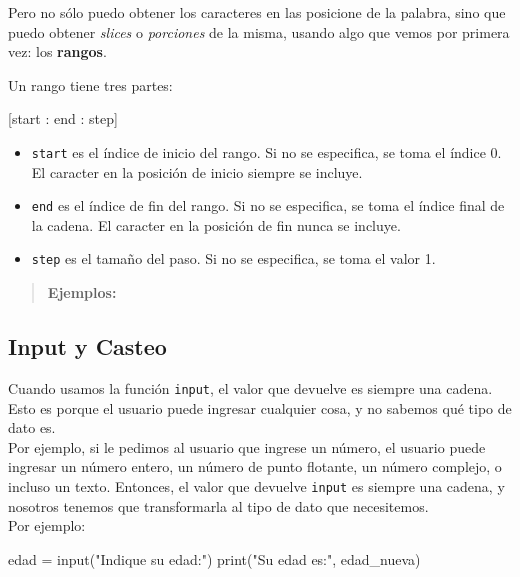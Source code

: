 \documentclass[
  letterpaper,
  DIV=11,
  numbers=noendperiod]{scrreprt}
\newenvironment{Shaded}{\begin{snugshade}}{\end{snugshade}}
\newcommand{\BuiltInTok}[1]{\textcolor[rgb]{0.00,0.23,0.31}{#1}}
\newcommand{\NormalTok}[1]{\textcolor[rgb]{0.00,0.23,0.31}{#1}}
\newcommand{\OperatorTok}[1]{\textcolor[rgb]{0.37,0.37,0.37}{#1}}
\newcommand{\StringTok}[1]{\textcolor[rgb]{0.13,0.47,0.30}{#1}}
\providecommand{\tightlist}{%
  \setlength{\itemsep}{0pt}\setlength{\parskip}{0pt}}\usepackage{longtable,booktabs,array}
\begin{document}
Pero no sólo puedo obtener los caracteres en las posicione de la
palabra, sino que puedo obtener \emph{slices} o \emph{porciones} de la
misma, usando algo que vemos por primera vez: los \textbf{rangos}.

Un rango tiene tres partes:

\begin{Shaded}
\begin{Highlighting}[]
\NormalTok{[start : end : step]}
\end{Highlighting}
\end{Shaded}

\begin{itemize}
\tightlist
\item
  \texttt{start} es el índice de inicio del rango. Si no se especifica,
  se toma el índice 0. El caracter en la posición de inicio siempre se
  incluye.
\item
  \texttt{end} es el índice de fin del rango. Si no se especifica, se
  toma el índice final de la cadena. El caracter en la posición de fin
  nunca se incluye.
\item
  \texttt{step} es el tamaño del paso. Si no se especifica, se toma el
  valor 1.
\end{itemize}

\begin{quote}
\textbf{Ejemplos:}
\end{quote}

\subsection{Input y Casteo}\label{input-y-casteo}

Cuando usamos la función \texttt{input}, el valor que devuelve es
siempre una cadena. Esto es porque el usuario puede ingresar cualquier
cosa, y no sabemos qué tipo de dato es.\\

Por ejemplo, si le pedimos al usuario que ingrese un número, el usuario
puede ingresar un número entero, un número de punto flotante, un número
complejo, o incluso un texto. Entonces, el valor que devuelve
\texttt{input} es siempre una cadena, y nosotros tenemos que
transformarla al tipo de dato que necesitemos.\\

Por ejemplo:

\begin{Shaded}
\begin{Highlighting}[]
\NormalTok{edad }\OperatorTok{=} \BuiltInTok{input}\NormalTok{(}\StringTok{"Indique su edad:"}\NormalTok{)}
\BuiltInTok{print}\NormalTok{(}\StringTok{"Su edad es:"}\NormalTok{, edad\_nueva)}
\end{Highlighting}
\end{Shaded}
\end{document}
